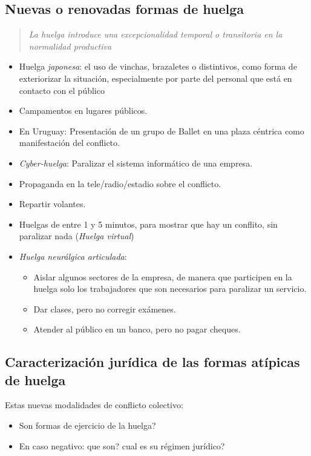 \documentclass[spanish,12pt,a4paper,titlepage]{report}
\begin{document}
\subsection{Nuevas o renovadas formas de huelga}


\begin{quote}
\textit{La huelga introduce una excepcionalidad temporal o transitoria en la normalidad productiva}
\end{quote}

\begin{itemize}
\item Huelga \textit{japonesa}: el uso de vinchas, brazaletes o distintivos, como forma de exteriorizar la situación, especialmente por parte del personal que está en contacto con el público
\item Campamentos en lugares públicos.
\item En Uruguay: Presentación de un grupo de Ballet en una plaza céntrica como manifestación del conflicto.
\item \textit{Cyber-huelga}: Paralizar el sistema informático de una empresa.
\item Propaganda en la tele/radio/estadio sobre el conflicto.
\item Repartir volantes.
\item Huelgas de entre 1 y 5 minutos, para mostrar que hay un conflito, sin paralizar nada (\textit{Huelga virtual})
\item \textit{Huelga neurálgica articulada}:
  \begin{itemize}
  \item Aislar algunos sectores de la empresa, de manera que participen en la huelga solo los trabajadores que son necesarios para paralizar un servicio.
  \item Dar clases, pero no corregir exámenes.
  \item Atender al público en un banco, pero no pagar cheques.
  \end{itemize}
\end{itemize}

\subsection{Caracterización jurídica de las formas atípicas de huelga}

Estas nuevas modalidades de conflicto colectivo:
\begin{itemize}
\item Son formas de ejercicio de la huelga?
\item En caso negativo: que son? cual es su régimen jurídico?
\end{itemize}
\end{document}
